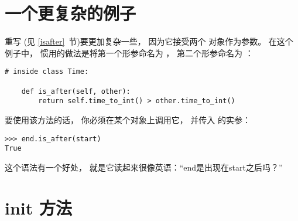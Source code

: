 \section{一个更复杂的例子}


重写  (见 \ref{isafter}~节)要更加复杂一些，
因为它接受两个  对象作为参数。
在这个例子中， 惯用的做法是将第一个形参命名为 ， 第二个形参命名为 ：

\begin{lstlisting}
# inside class Time:

    def is_after(self, other):
        return self.time_to_int() > other.time_to_int()
\end{lstlisting}

%

要使用该方法的话， 你必须在某个对象上调用它， 并传入  的实参：

\begin{lstlisting}
>>> end.is_after(start)
True
\end{lstlisting}

%

这个语法有一个好处， 就是它读起来很像英语：``end是出现在start之后吗？''

\section{init 方法}
  


